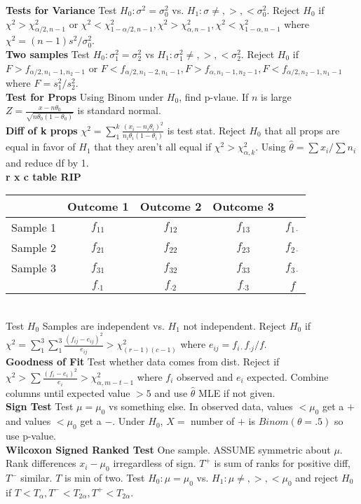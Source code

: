 \documentclass[10pt]{article}
\begin{document}
{\bf Tests for Variance} Test $H_0:\sigma^2=\sigma_0^2$ vs. $H_1:\sigma\neq,>,<\sigma_0^2$. Reject $H_0$ if $\chi^2>\chi^2_{\alpha/2,n-1}$ or $\chi^2<\chi^2_{1-\alpha/2,n-1},\chi^2>\chi^2_{\alpha,n-1},\chi^2<\chi^2_{1-\alpha,n-1}$ where $\chi^2=(n-1)s^2/\sigma_0^2$.\\
{\bf Two samples} Test $H_0:\sigma^2_1=\sigma^2_2$ vs $H_1:\sigma_1^2\neq,>,<\sigma_2^2$. Reject $H_0$ if $F>f_{\alpha/2,n_1-1,n_2-1}$ or $F<f_{\alpha/2,n_1-2,n_1-1}, F>f_{\alpha,n_1-1,n_2-1}, F<f_{\alpha/2,n_2-1,n_1-1}$ where $F=s_1^2/s_2^2$.\\
{\bf Test for Props} Using Binom under $H_0$, find p-vlaue. If $n$ is large $Z=\frac{x-n\theta_0}{\sqrt{n\theta_0(1-\theta_0)}}$ is standard normal.\\
{\bf Diff of k props} $\chi^2=\sum_1^k\frac{(x_i-n_i\theta_i)^2}{n_i\theta_i(1-\theta_i)}$ is test stat. Reject $H_0$ that all props are equal in favor of $H_1$ that they aren't all equal if $\chi^2>\chi^2_{\alpha,k}$. Using $\hat\theta=\sum x_i/\sum n_i$ and reduce df by 1.\\
{\bf r x c table RIP}
\begin{tabular}{|c| c| c| c|| c}\hline
&Outcome 1&Outcome 2&Outcome 3\\\hline
Sample 1&$f_{11}$&$f_{12}$&$f_{13}$&$f_{1\cdot}$\\\hline
Sample 2&$f_{21}$&$f_{22}$&$f_{23}$&$f_{2\cdot}$\\\hline
Sample 3&$f_{31}$&$f_{32}$&$f_{33}$&$f_{3\cdot}$\\\hline\hline
&$f_{\cdot 1}$&$f_{\cdot 2}$&$f_{\cdot 3}$&$f$\\\hline
\end{tabular}\\
Test $H_0$ Samples are independent vs. $H_1$ not independent. Reject $H_0$ if $\chi^2=\sum_1^3\sum_1^3\frac{(f_{ij}-e_{ij})^2}{e_{ij}}>\chi^2_{(r-1)(c-1)}$ where $e_{ij}=f_{i\cdot}f_{\cdot j}/f$.\\
{\bf Goodness of Fit} Test whether data comes from dist. Reject if $\chi^2>\sum \frac{(f_i-e_i)^2}{e_i}>\chi^2_{\alpha,m-t-1}$ where $f_i$ observed and $e_i$ expected. Combine columns until expected value $>5$ and use $\hat\theta$ MLE if not given.\\
{\bf Sign Test} Test $\mu=\mu_0$ vs something else. In observed data, values $<\mu_0$ get a $+$ and values $<\mu_0$ get a $-$. Under $H_0$, $X=$ number of $+$ is $Binom(\theta=.5)$ so use p-value.\\
{\bf Wilcoxon Signed Ranked Test}  One sample. ASSUME symmetric about $\mu$. Rank differences $x_i-\mu_0$ irregardless of sign. $T^+$ is sum of ranks for positive diff, $T^-$ similar. $T$ is min of two. Test $H_0:\mu=\mu_0$ vs. $H_1:\mu\neq,>,<\mu_0$ and reject $H_0$ if $T<T_{\alpha},T^-<T_{2\alpha},T^+<T_{2\alpha}$.\\
\end{document}
